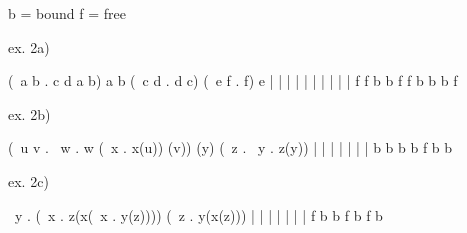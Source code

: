 b = bound
f = free

ex. 2a)

(\ a b . c d a b) a b (\ c d . d c) (\ e f . f) e
         | | | |  | |          | |           |  |
         f f b b  f f          b b           b  f
         
ex. 2b)

{(\ u v . \ w . w (\ x . x(u)) (v)) (y)} (\ z . \ y . z(y))
                |        | |    |    |                | |
                b        b b    b    f                b b
                
ex. 2c)

\ y . (\ x . z(x(\ x . y(z)))) (\ z . y(x(z)))
             | |       | |            | | |
             f b       b f            b f b
